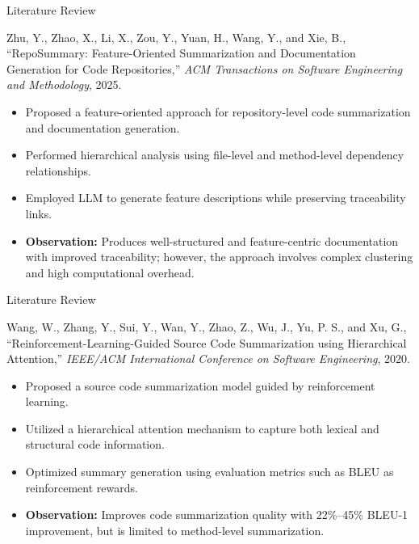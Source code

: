 \documentclass{beamer}
\begin{document}
\begin{frame}{Literature Review}
\justifying
\hypertarget{lit5}{}
\begin{block}{Zhu, Y., Zhao, X., Li, X., Zou, Y., Yuan, H., Wang, Y., and Xie, B.,
“RepoSummary: Feature-Oriented Summarization and Documentation Generation for Code Repositories,”
\textit{ACM Transactions on Software Engineering and Methodology}, 2025.}
\end{block}

\begin{itemize}
\justifying
    \item Proposed a feature-oriented approach for repository-level code summarization and documentation generation.
    \item Performed hierarchical analysis using file-level and method-level dependency relationships.
    \item Employed LLM to generate feature descriptions while preserving traceability links.
    \item \textbf{Observation:} Produces well-structured and feature-centric documentation with improved traceability; however, the approach involves complex clustering and high computational overhead.
\end{itemize}
\end{frame}
\begin{frame}{Literature Review}
\justifying
\hypertarget{lit4}{}
\begin{block}{Wang, W., Zhang, Y., Sui, Y., Wan, Y., Zhao, Z., Wu, J., Yu, P. S., and Xu, G.,
“Reinforcement-Learning-Guided Source Code Summarization using Hierarchical Attention,”
\textit{IEEE/ACM International Conference on Software Engineering}, 2020.}
\end{block}

\begin{itemize}
\justifying
    \item Proposed a source code summarization model guided by reinforcement learning.
    \item Utilized a hierarchical attention mechanism to capture both lexical and structural code information.
    \item Optimized summary generation using evaluation metrics such as BLEU as reinforcement rewards.
    \item \textbf{Observation:} Improves code summarization quality with 22\%--45\% BLEU-1 improvement, but is limited to method-level summarization.

\end{itemize}
\end{frame}
\end{document}
